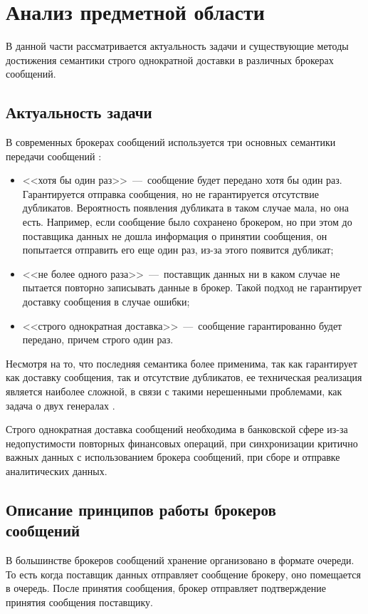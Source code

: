 \chapter{Анализ предметной области}

В данной части рассматривается актуальность задачи и существующие методы достижения семантики строго однократной доставки в различных брокерах сообщений.

\section{Актуальность задачи}

В современных брокерах сообщений используется три основных семантики передачи сообщений \cite{bib:4}:

\begin{itemize}
	\item <<хотя бы один раз>>~---~сообщение будет передано хотя бы один раз. Гарантируется отправка сообщения, но не гарантируется отсутствие дубликатов. Вероятность появления дубликата в таком случае мала, но она есть. Например, если сообщение было сохранено брокером, но при этом до поставщика данных не дошла информация о принятии сообщения, он попытается отправить его еще один раз, из-за этого появится дубликат;
	\item <<не более одного раза>>~---~поставщик данных ни в каком случае не пытается повторно записывать данные в брокер. Такой подход не гарантирует доставку сообщения в случае ошибки;
	\item <<строго однократная доставка>>~---~сообщение гарантированно будет передано, причем строго один раз.
\end{itemize}

Несмотря на то, что последняя семантика более применима, так как гарантирует как доставку сообщения, так и отсутствие дубликатов, ее техническая реализация является наиболее сложной, в связи с такими нерешенными проблемами, как задача о двух генералах \cite{bib:3}.

Строго однократная доставка сообщений необходима в банковской сфере из-за недопустимости повторных финансовых операций, при синхронизации критично важных данных с использованием брокера сообщений, при сборе и отправке аналитических данных.

\section[Описание принципов работы брокеров сообщений]{Описание принципов работы брокеров \\ сообщений}
В большинстве брокеров сообщений хранение организовано в формате очереди. 
То есть когда поставщик данных отправляет сообщение брокеру, оно помещается в очередь. 
После принятия сообщения, брокер отправляет подтверждение принятия сообщения поставщику. 

